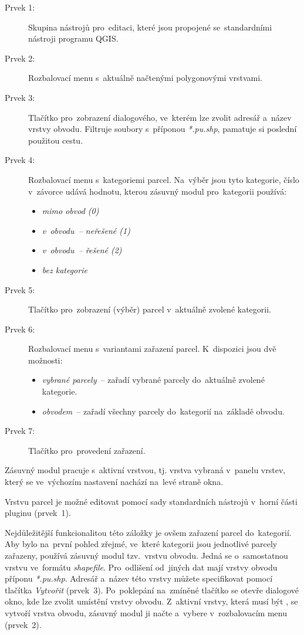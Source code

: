 \begin{description}
	\item[Prvek 1:] Skupina nástrojů pro~editaci, které jsou propojené se~standardními nástro\-ji programu QGIS.
	\item[Prvek 2:] Rozbalovací menu s~aktuálně načtenými polygonovými vrstvami.
	\item[Prvek 3:] Tlačítko pro~zobrazení dialogového, ve~kterém lze zvolit adresář a~název vrstvy obvodu. Filtruje soubory s~příponou \textit{*.pu.shp}, pamatuje si poslední použitou cestu.
	\item[Prvek 4:] Rozbalovací menu s~kategoriemi parcel. Na~výběr jsou tyto kategorie, číslo v~závorce udává hodnotu, kterou zásuvný modul pro~kategorii používá:
	\begin{itemize}[leftmargin=1.5cm, noitemsep]
		\item \textit{mimo obvod (0)}
		\item \textit{v~obvodu~– neřešené (1)}
		\item \textit{v~obvodu~– řešené (2)}
		\item \textit{bez kategorie}
	\end{itemize}
	\item[Prvek 5:] Tlačítko pro~zobrazení (výběr) parcel v~aktuálně zvolené kategorii.
	\item[Prvek 6:] Rozbalovací menu s~variantami zařazení parcel. K~dispozici jsou dvě možnosti:
	\begin{itemize}[leftmargin=1.5cm, noitemsep]
		\item \textit{vybrané parcely}~– zařadí vybrané parcely do~aktuálně zvolené kategorie.
		\item \textit{obvodem}~– zařadí všechny parcely do~kategorií na~základě obvodu.
	\end{itemize}
	\item[Prvek 7:] Tlačítko pro~provedení zařazení.
\end{description}

Zásuvný modul pracuje s~aktivní vrstvou, tj. vrstva vybraná v~panelu vrstev, který se ve~výchozím nastavení nachází na~levé straně okna.

Vrstvu parcel je možné editovat pomocí sady standardních nástrojů v~horní části pluginu (prvek~1).

Nejdůležitější funkcionalitou této záložky je ovšem zařazení parcel do~kategorií. Aby bylo na~první pohled zřejmé, ve~které kategorii jsou jednotlivé parcely zařazeny, používá zásuvný modul tzv.~vrstvu obvodu. Jedná se o~samostatnou vrstvu ve~formátu \textit{shapefile}. Pro~odlišení od~jiných dat mají vrstvy obvodu příponu \textit{*.pu.shp}. Adresář a~název této vrstvy můžete specifikovat pomocí tlačítka \textit{Vytvořit} (prvek~3). Po~poklepání na~zmíněné tlačítko se otevře dialogové okno, kde lze zvolit umístění vrstvy obvodu. Z~aktivní vrstvy, která musí být , se vytvoří vrstva obvodu, zásuvný modul ji načte a~vybere v~rozbalovacím menu (prvek~2).

